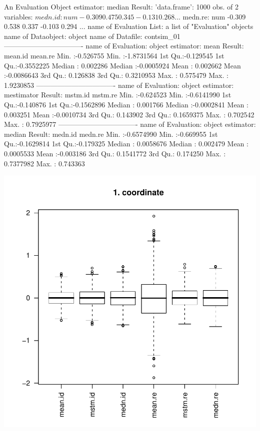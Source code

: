 \documentclass[11pt]{article}
\begin{document}
\begin{Schunk}
\begin{Soutput}
An Evaluation Object
estimator: median
Result: 'data.frame':	1000 obs. of  2 variables:
 $ medn.id: num  -0.309  0.475  0.345 -0.131  0.268 ...
 $ medn.re: num  -0.309  0.538  0.337 -0.103  0.294 ...
name of Evaluation List: a list of "Evaluation" objects
name of Dataobject: object
name of Datafile: contsim_01
----------------------------------
name of Evaluation: object
estimator: mean
Result:
    mean.id             mean.re          
 Min.   :-0.526755   Min.   :-1.8731564  
 1st Qu.:-0.129545   1st Qu.:-0.3552225  
 Median : 0.002286   Median :-0.0005924  
 Mean   : 0.002662   Mean   :-0.0086643  
 3rd Qu.: 0.126838   3rd Qu.: 0.3210953  
 Max.   : 0.575479   Max.   : 1.9230853  
----------------------------------
name of Evaluation: object
estimator: mestimator
Result:
    mstm.id             mstm.re          
 Min.   :-0.624523   Min.   :-0.6141990  
 1st Qu.:-0.140876   1st Qu.:-0.1562896  
 Median : 0.001766   Median :-0.0002841  
 Mean   : 0.003251   Mean   :-0.0010734  
 3rd Qu.: 0.143902   3rd Qu.: 0.1659375  
 Max.   : 0.702542   Max.   : 0.7925977  
----------------------------------
name of Evaluation: object
estimator: median
Result:
    medn.id              medn.re         
 Min.   :-0.6574990   Min.   :-0.669955  
 1st Qu.:-0.1629814   1st Qu.:-0.179325  
 Median : 0.0058676   Median : 0.002479  
 Mean   : 0.0005533   Mean   :-0.003186  
 3rd Qu.: 0.1541772   3rd Qu.: 0.174250  
 Max.   : 0.7377982   Max.   : 0.743363  
\end{Soutput}
\end{Schunk}
\includegraphics{distr-elist}
\end{document}
